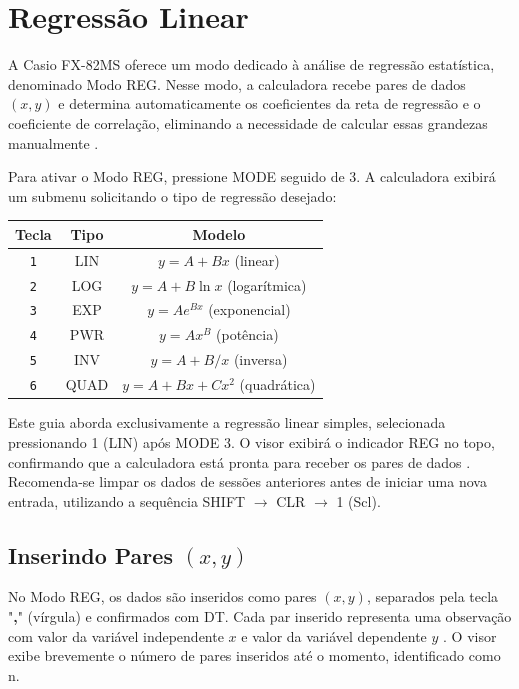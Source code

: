 \chapter{Regressão Linear}

A Casio FX-82MS oferece um modo dedicado à análise de regressão estatística, denominado Modo REG. Nesse modo, a calculadora recebe pares de dados $(x, y)$ e determina automaticamente os coeficientes da reta de regressão e o coeficiente de correlação, eliminando a necessidade de calcular essas grandezas manualmente \cite{casio2004}.

Para ativar o Modo REG, pressione MODE seguido de 3. A calculadora exibirá um submenu solicitando o tipo de regressão desejado:

\begin{table}[H]
    \centering
    \begin{tabular}{|c|c|c|}
        \hline
        \textbf{Tecla} & \textbf{Tipo} & \textbf{Modelo} \\ \hline
        \texttt{1} & LIN & $y = A + Bx$ (linear) \\
        \texttt{2} & LOG & $y = A + B \ln x$ (logarítmica) \\
        \texttt{3} & EXP & $y = A e^{Bx}$ (exponencial) \\
        \texttt{4} & PWR & $y = A x^B$ (potência) \\
        \texttt{5} & INV & $y = A + B/x$ (inversa) \\
        \texttt{6} & QUAD & $y = A + Bx + Cx^2$ (quadrática) \\ \hline
    \end{tabular}
\end{table}

Este guia aborda exclusivamente a regressão linear simples, selecionada pressionando 1 (LIN) após MODE 3. O visor exibirá o indicador REG no topo, confirmando que a calculadora está pronta para receber os pares de dados \cite{casio2004}. Recomenda-se limpar os dados de sessões anteriores antes de iniciar uma nova entrada, utilizando a sequência SHIFT $\to$ CLR $\to$ 1 (Scl).

\section{Inserindo Pares \texorpdfstring{$(x,y)$}{(x,y)}}

No Modo REG, os dados são inseridos como pares $(x, y)$, separados pela tecla "\textbf{,}" (vírgula) e confirmados com DT. Cada par inserido representa uma observação com valor da variável independente $x$ e valor da variável dependente $y$ \cite{casio2004}. O visor exibe brevemente o número de pares inseridos até o momento, identificado como n.

